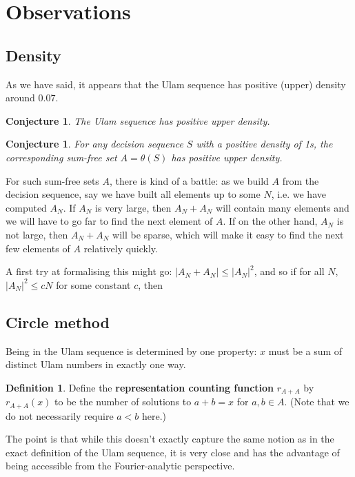\documentclass{article}
\newtheorem{conjecture}[theorem]{Conjecture}
\theoremstyle{definition}
\newtheorem{definition}{Definition}
\theoremstyle{remark}
\numberwithin{equation}{section}
\begin{document}
{\section{Observations}

\subsection{Density}

As we have said, it appears that the Ulam sequence has positive
(upper) density around $0.07$.  

\begin{conjecture}
The Ulam sequence has positive upper density.
\end{conjecture}


\begin{conjecture}
  For any decision sequence $S$ with a positive density of 1s, the
  corresponding sum-free set $A = \theta(S)$ has positive upper density.
\end{conjecture}

For such sum-free sets $A$, there is kind of a battle: as we build $A$
from the decision sequence, say we have built all elements up to some
$N$, i.e. we have computed $A_N$.  If $A_N$ is very large, then
$A_N+A_N$ will contain many elements and we will have to go far to
find the next element of $A$.  If on the other hand, $A_N$ is not
large, then $A_N + A_N$ will be sparse, which will make it easy to
find the next few elements of $A$ relatively quickly.  

A first try at formalising this might go: $|A_N + A_N| \leq |A_N|^2$,
and so if for all $N$, $|A_N|^2 \leq cN$ for some constant $c$, then


\subsection{Circle method}

Being in the Ulam sequence is determined by one property: $x$ must be
a sum of distinct Ulam numbers in exactly one way.  

\begin{definition}Define the \textbf{representation counting function}
  $r_{A+A}$ by $r_{A+A}(x)$ to be the number of solutions to $a+b = x$
  for $a, b \in A$.  (Note that we do not necessarily require $a < b$
  here.)
\end{definition} 

The point is that while this doesn't exactly capture the same notion
as in the exact definition of the Ulam sequence, it is very close and
has the advantage of being accessible from the Fourier-analytic
perspective.  

}
\end{document}
